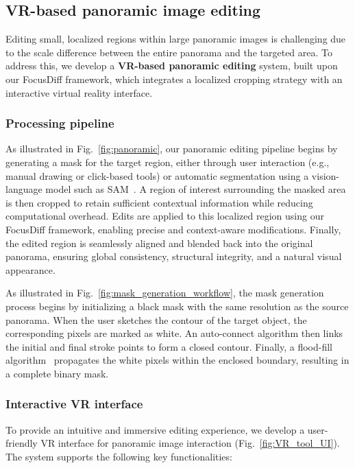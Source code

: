 \documentclass[runningheads]{llncs}
\begin{document}
\subsection{VR-based panoramic image editing}



Editing small, localized regions within large panoramic images is challenging due to the scale difference between the entire panorama and the targeted area. To address this, we develop a \textbf{VR-based panoramic editing} system, built upon our FocusDiff framework, which integrates a localized cropping strategy with an interactive virtual reality interface.

\subsubsection{Processing pipeline}

As illustrated in Fig.~\ref{fig:panoramic}, our panoramic editing pipeline begins by generating a mask for the target region, either through user interaction (e.g., manual drawing or click-based tools) or automatic segmentation using a vision-language model such as SAM~\cite{kirillov2023segment}. A region of interest surrounding the masked area is then cropped to retain sufficient contextual information while reducing computational overhead. Edits are applied to this localized region using our FocusDiff framework, enabling precise and context-aware modifications. Finally, the edited region is seamlessly aligned and blended back into the original panorama, ensuring global consistency, structural integrity, and a natural visual appearance.

As illustrated in Fig.~\ref{fig:mask_generation_workflow}, the mask generation process begins by initializing a black mask with the same resolution as the source panorama. When the user sketches the contour of the target object, the corresponding pixels are marked as white. An auto-connect algorithm then links the initial and final stroke points to form a closed contour. Finally, a flood-fill algorithm~\cite{BURTSEV1993549} propagates the white pixels within the enclosed boundary, resulting in a complete binary mask.

\subsubsection{Interactive VR interface}
To provide an intuitive and immersive editing experience, we develop a user-friendly VR interface for panoramic image interaction (Fig.~\ref{fig:VR_tool_UI}). The system supports the following key functionalities:
\end{document}
